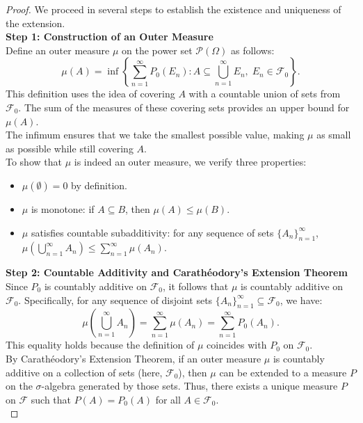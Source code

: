     \begin{proof}
    We proceed in several steps to establish the existence and uniqueness of the extension.\\
    
    \textbf{Step 1: Construction of an Outer Measure}\\
    
    Define an outer measure \( \mu \) on the power set \( \mathcal{P}(\Omega) \) as follows:
    \[
    \mu(A) = \inf\left\{\sum_{n=1}^{\infty} P_0(E_n) : A \subseteq \bigcup_{n=1}^{\infty} E_n, \; E_n \in \mathcal{F}_0\right\}.
    \]
    This definition uses the idea of covering \( A \) with a countable union of sets from \( \mathcal{F}_0 \). The sum of the measures of these covering sets provides an upper bound for \( \mu(A) \). \\
    
    The infimum ensures that we take the smallest possible value, making \( \mu \) as small as possible while still covering \( A \).\\
    
    To show that \( \mu \) is indeed an outer measure, we verify three properties:
    \begin{itemize}
        \item \( \mu(\emptyset) = 0 \) by definition.
        \item \( \mu \) is monotone: if \( A \subseteq B \), then \( \mu(A) \leq \mu(B) \).
        \item \( \mu \) satisfies countable subadditivity: for any sequence of sets \( \{A_n\}_{n=1}^{\infty} \), \( \mu\left(\bigcup_{n=1}^{\infty} A_n\right) \leq \sum_{n=1}^{\infty} \mu(A_n) \).
    \end{itemize}
    
    \textbf{Step 2: Countable Additivity and Carathéodory's Extension Theorem}\\
    
    Since \( P_0 \) is countably additive on \( \mathcal{F}_0 \), it follows that \( \mu \) is countably additive on \( \mathcal{F}_0 \). Specifically, for any sequence of disjoint sets \( \{A_n\}_{n=1}^{\infty} \subseteq \mathcal{F}_0 \), we have:
    \[
    \mu\left(\bigcup_{n=1}^{\infty} A_n\right) = \sum_{n=1}^{\infty} \mu(A_n) = \sum_{n=1}^{\infty} P_0(A_n).
    \]
    This equality holds because the definition of \( \mu \) coincides with \( P_0 \) on \( \mathcal{F}_0 \). \\
    
    By Carathéodory's Extension Theorem, if an outer measure \( \mu \) is countably additive on a collection of sets (here, \( \mathcal{F}_0 \)), then \( \mu \) can be extended to a measure \( P \) on the \( \sigma \)-algebra generated by those sets. Thus, there exists a unique measure \( P \) on \( \mathcal{F} \) such that \( P(A) = P_0(A) \) for all \( A \in \mathcal{F}_0 \).\\
    

\end{proof}
